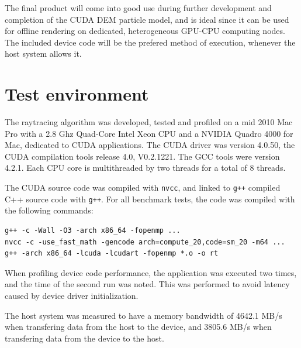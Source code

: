 \documentclass[journal]{IEEEtran}
\begin{document}
The final product will come into good use during further development and completion of the CUDA DEM particle model, and is ideal since it can be used for offline rendering on dedicated, heterogeneous GPU-CPU computing nodes. The included device code will be the prefered method of execution, whenever the host system allows it.






\appendices

\section{Test environment}
The raytracing algorithm was developed, tested and profiled on a mid 2010 Mac Pro with a \num{2.8} Ghz Quad-Core Intel Xeon CPU and a NVIDIA Quadro 4000 for Mac, dedicated to CUDA applications. The CUDA driver was version 4.0.50, the CUDA compilation tools release 4.0, V0.2.1221. The GCC tools were version 4.2.1. Each CPU core is multithreaded by two threads for a total of 8 threads.

The CUDA source code was compiled with \texttt{nvcc}, and linked to \texttt{g++} compiled C++ source code with \texttt{g++}. For all benchmark tests, the code was compiled with the following commands:
\begin{lstlisting}
g++ -c -Wall -O3 -arch x86_64 -fopenmp ... 
nvcc -c -use_fast_math -gencode arch=compute_20,code=sm_20 -m64 ...
g++ -arch x86_64 -lcuda -lcudart -fopenmp *.o -o rt
\end{lstlisting}
When profiling device code performance, the application was executed two times, and the time of the second run was noted. This was performed to avoid latency caused by device driver initialization.

The host system was measured to have a memory bandwidth of 4642.1 MB/s when transfering data from the host to the device, and 3805.6 MB/s when transfering data from the device to the host.

\ifCLASSOPTIONcaptionsoff
  \newpage
\fi




\end{document}

